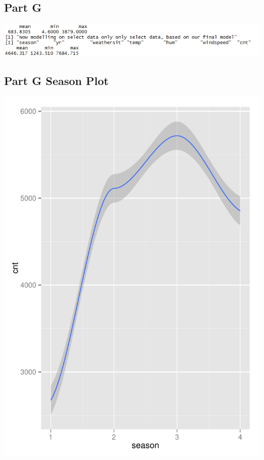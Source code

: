 \documentclass[11pt]{article}
\begin{document}
\subsection{Part G}
\label{subsec:problem2goutput}
\includegraphics[width=\textwidth]{OutputPartG.jpg}
\pagebreak
\subsection{Part G Season Plot}
\label{subsec:problem2gplotsSeason}
\includegraphics{Problem2G-Season.pdf}
\pagebreak
\end{document}

